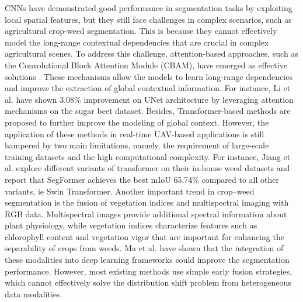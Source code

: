 \documentclass[pdflatex,sn-mathphys-num]{sn-jnl}
\begin{document}
CNNs have demonstrated good performance in segmentation tasks by exploiting local spatial features, but they still face challenges in complex scenarios, such as agricultural crop-weed segmentation. This is because they cannot effectively model the long-range contextual dependencies that are crucial in complex agricultural scenes. To address this challenge, attention-based approaches, such as the Convolutional Block Attention Module (CBAM), have emerged as effective solutions \cite{woo2018cbam,hu2018senet,oktay2018attentionunet,wang2018nonlocal}. These mechanisms allow the models to learn long-range dependencies and improve the extraction of global contextual information. For instance, Li et al.\cite{li2025improved} have shown 3.08\% improvement on  UNet architecture by leveraging attention mechanisms on the sugar beet dataset. Besides, Transformer-based methods  \cite{dosovitskiy2021vit, xie2021segformer, liu2021swin} are proposed to further improve the modeling of global context. However, the application of these methods in real-time UAV-based applications is still hampered by two main limitations, namely, the requirement of large-scale training datasets and the high computational complexity. For instance, Jiang et al.\cite{jiang2022transformer} explore different variants of transformer on their in-house weed datasets and report that SegFormer achieves the best mIoU 65.74\% compared to all other variants, ie Swin Transformer.
Another important trend in crop–weed segmentation is the fusion of vegetation indices \cite{hunt2013vegetation} and multispectral imaging \cite{zhang2021multispectral} with RGB data. Multispectral images provide additional spectral information about plant physiology, while vegetation indices characterize features such as chlorophyll content and vegetation vigor that are important for enhancing the separability of crops from weeds. Ma et al. \cite{ma2024vegetation_dl} have shown that the integration of these modalities into deep learning frameworks could improve the segmentation performance. However, most existing methods use simple early fusion strategies, which cannot effectively solve the distribution shift problem from heterogeneous data modalities. 
\end{document}
